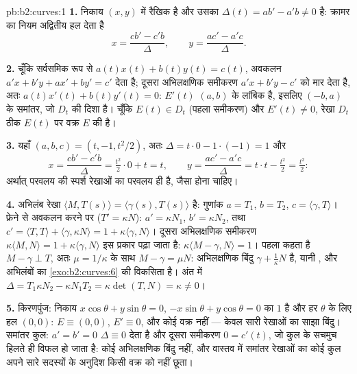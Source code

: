 \begin{solution}{pb:b2:curves:1}
\textbf{1.} निकाय $(x, y)$ में रैखिक है और उसका 
$\Delta(t) = a b' - a'b \neq 0$ है: क्रामर का नियम अद्वितीय हल
देता है
\[
x = \frac{c b' - c' b}{\Delta}, \qquad
y = \frac{a c' - a' c}{\Delta}.
\]

\textbf{2.} चूँकि सर्वसमिक रूप से $a(t)x(t) + b(t)y(t) = c(t)$, अवकलन
$a'x + b'y + ax' + by' = c'$ देता है; दूसरा अभिलक्षणिक समीकरण $a'x + b'y - c'$ को मार
देता है, अतः $a(t)x'(t) + b(t)y'(t) = 0$: $E'(t)$ $(a,
b)$ के लांबिक है, इसलिए $(-b, a)$ के समांतर, जो $D_t$ की दिशा है। चूँकि
$E(t) \in D_t$ (पहला समीकरण) और $E'(t) \neq 0$, रेखा
$D_t$ ठीक $E(t)$ पर वक्र $E$ की  है।

\textbf{3.} यहाँ $(a, b, c) = (t, -1, t^2/2)$, अतः $\Delta =
t\cdot0 - 1\cdot(-1) = 1$ और
\[
x = \frac{c b' - c' b}{\Delta} = \tfrac{t^2}2\cdot 0 +
t = t, \qquad
y = \frac{a c' - a' c}{\Delta} = t\cdot t - \tfrac{t^2}2 =
\tfrac{t^2}2 :
\]
अर्थात् परवलय की स्पर्श रेखाओं का  परवलय ही है, जैसा
होना चाहिए।

\textbf{4.} अभिलंब रेखा $\langle M, T(s)\rangle =
\langle\gamma(s), T(s)\rangle$ है: गुणांक $a = T_1$, $b =
T_2$, $c = \langle\gamma, T\rangle$। फ्रेने से
अवकलन करने पर ($T' = \kappa N$): $a' = \kappa N_1$, $b' = \kappa
N_2$, तथा $c' = \langle T, T\rangle + \langle\gamma, \kappa
N\rangle = 1 + \kappa\langle\gamma, N\rangle$। दूसरा
अभिलक्षणिक समीकरण $\kappa\langle M, N\rangle = 1 +
\kappa\langle\gamma, N\rangle$ इस प्रकार पढ़ा जाता है: $\kappa\langle M -
\gamma, N\rangle = 1$। पहला कहता है $M - \gamma \perp T$,
अतः $\mu = 1/\kappa$ के साथ $M - \gamma = \mu N$: अभिलक्षणिक
बिंदु $\gamma + \frac1\kappa N$ है, यानी , और अभिलंबों
का  \cref{exo:b2:curves:6} की विकसिता है। अंत में $\Delta = T_1\kappa N_2 -
\kappa N_1 T_2 = \kappa\det(T, N) = \kappa \neq 0$।

\textbf{5.} किरणपुंज: निकाय $x\cos\theta + y\sin\theta =
0$, $-x\sin\theta + y\cos\theta = 0$ का  $1$ है और
हर $\theta$ के लिए हल $(0,0)$: $E \equiv (0,0)$, $E'
\equiv 0$, और कोई वक्र नहीं --- केवल सारी रेखाओं का साझा
बिंदु। समांतर कुल: $a' = b' = 0$ $\Delta \equiv 0$
देता है और दूसरा समीकरण $0 = c'(t)$, जो कुल के सचमुच हिलते ही विफल
हो जाता है: कोई अभिलक्षणिक बिंदु नहीं, और वास्तव में समांतर रेखाओं
का कोई कुल अपने सारे सदस्यों के अनुदिश किसी वक्र को नहीं छूता।


\end{solution}
